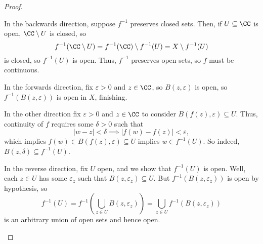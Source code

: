 \documentclass[../notes.tex]{subfiles}
\begin{document}
\begin{proof}
\begin{listalph}
		In the backwards direction, suppose $f^{-1}$ preserves closed sets. Then, if $U\subseteq\CC$ is open, $\CC\setminus U$ is closed, so
		\[f^{-1}(\CC\setminus U)=f^{-1}(\CC)\setminus f^{-1}(U)=X\setminus f^{-1}(U)\]
		is closed, so $f^{-1}(U)$ is open. Thus, $f^{-1}$ preserves open sets, so $f$ must be continuous.

		\item In the forwards direction, fix $\varepsilon>0$ and $z\in\CC$, so $B(z,\varepsilon)$ is open, so $f^{-1}(B(z,\varepsilon))$ is open in $X$, finishing.
		
		In the other direction fix $\varepsilon>0$ and $z\in\CC$ to consider $B(f(z),\varepsilon)\subseteq U$. Thus, continuity of $f$ requires some $\delta>0$ such that
		\[|w-z|<\delta\implies|f(w)-f(z)|<\varepsilon,\]
		which implies $f(w)\in B(f(z),\varepsilon)\subseteq U$ implies $w\in f^{-1}(U)$. So indeed, $B(z,\delta)\subseteq f^{-1}(U)$.

		In the reverse direction, fix $U$ open, and we show that $f^{-1}(U)$ is open. Well, each $z\in U$ has some $\varepsilon_z$ such that $B(z,\varepsilon_z)\subseteq U$. But $f^{-1}(B(z,\varepsilon_z))$ is open by hypothesis, so
		\[f^{-1}(U)=f^{-1}\left(\bigcup_{z\in U}B(z,\varepsilon_z)\right)=\bigcup_{z\in U}f^{-1}(B(z,\varepsilon_z))\]
		is an arbitrary union of open sets and hence open.
		\qedhere
	\end{listalph}
\end{proof}
\end{document}
